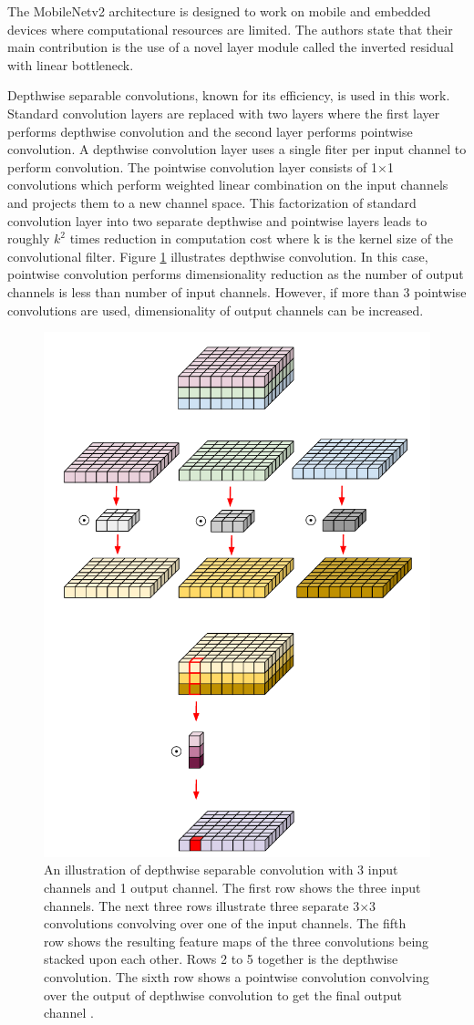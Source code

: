 
The MobileNetv2 architecture is designed to work on mobile and embedded devices where computational resources are limited. The authors state that their main contribution is the use of a novel layer module called the inverted residual with linear bottleneck. 

Depthwise separable convolutions, known for its efficiency, is used in this work. Standard convolution layers are replaced with two layers where the first layer performs depthwise convolution and the second layer performs pointwise convolution. A depthwise convolution layer uses a single fiter per input channel to perform convolution. The pointwise convolution layer consists of 1$\times$1 convolutions which perform weighted linear combination on the input channels and projects them to a new channel space. This factorization of standard convolution layer into two separate depthwise and pointwise layers leads to roughly $k^2$ times reduction in computation cost where k is the kernel size of the convolutional filter. Figure \ref{Fig:depthwise} illustrates depthwise convolution. In this case, pointwise convolution performs dimensionality reduction as the number of output channels is less than number of input channels. However, if more than 3 pointwise convolutions are used, dimensionality of output channels can be increased.

	\begin{figure}
		\centering
		\includegraphics[width=.5\linewidth]{images/depthwise}
		\caption{An illustration of depthwise separable convolution with 3 input channels and 1 output channel. The first row shows the three input channels. The next three rows illustrate three separate 3$\times$3 convolutions convolving over one of the input channels. The fifth row shows the resulting feature maps of the three convolutions being stacked upon each other. Rows 2 to 5 together is the depthwise convolution. The sixth row shows a pointwise convolution convolving over the output of depthwise convolution to get the final output channel \cite{depthwise}.}
		\label{Fig:depthwise}
	\end{figure}

